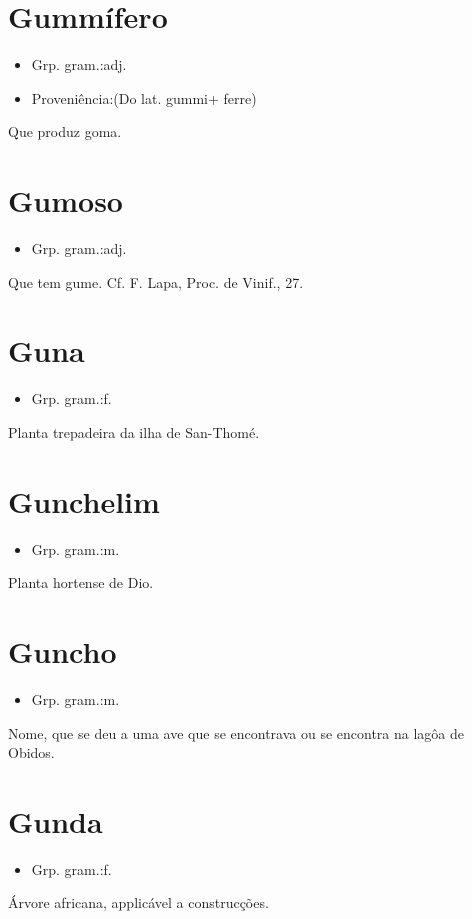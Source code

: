\section{Gummífero}
\begin{itemize}
\item {Grp. gram.:adj.}
\end{itemize}
\begin{itemize}
\item {Proveniência:(Do lat. \textunderscore gummi\textunderscore  + \textunderscore ferre\textunderscore )}
\end{itemize}
Que produz goma.
\section{Gumoso}
\begin{itemize}
\item {Grp. gram.:adj.}
\end{itemize}
Que tem gume. Cf. F. Lapa, \textunderscore Proc. de Vinif.\textunderscore , 27.
\section{Guna}
\begin{itemize}
\item {Grp. gram.:f.}
\end{itemize}
Planta trepadeira da ilha de San-Thomé.
\section{Gunchelim}
\begin{itemize}
\item {Grp. gram.:m.}
\end{itemize}
Planta hortense de Dio.
\section{Guncho}
\begin{itemize}
\item {Grp. gram.:m.}
\end{itemize}
Nome, que se deu a uma ave que se encontrava ou se encontra na lagôa de Obidos.
\section{Gunda}
\begin{itemize}
\item {Grp. gram.:f.}
\end{itemize}
Árvore africana, applicável a construcções.
